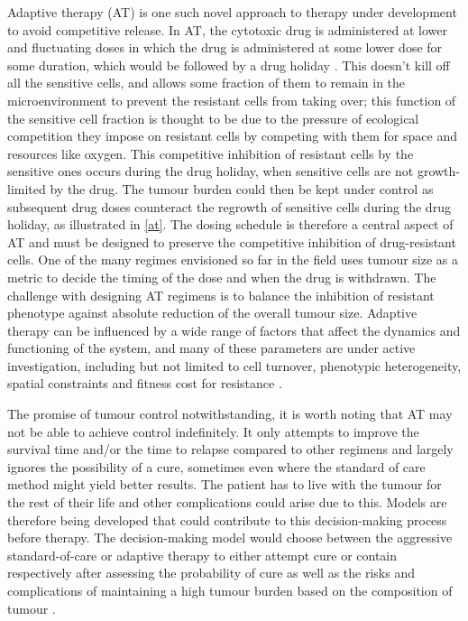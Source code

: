 Adaptive therapy (AT) is one such novel approach to therapy under development to avoid competitive release. In AT, the cytotoxic drug is administered at lower and fluctuating doses in which the drug is administered at some lower dose for some duration, which would be followed by a drug holiday \cite{Gatenby}. This doesn’t kill off all the sensitive cells, and allows some fraction of them to remain in the microenvironment to prevent the resistant cells from taking over; this function of the sensitive cell fraction is thought to be due to the pressure of ecological competition they impose on resistant cells by competing with them for space and resources like oxygen. This competitive inhibition of resistant cells by the sensitive ones occurs during the drug holiday, when sensitive cells are not growth-limited by the drug. The tumour burden could then be kept under control as subsequent drug doses counteract the regrowth of sensitive cells during the drug holiday, as illustrated in \autoref{at}. The dosing schedule is therefore a central aspect of AT and must be designed to preserve the competitive inhibition of drug-resistant cells. One of the many regimes envisioned so far in the field uses tumour size as a metric to decide the timing of the dose and when the drug is withdrawn. The challenge with designing AT regimens is to balance the inhibition of resistant phenotype against absolute reduction of the overall tumour size. Adaptive therapy can be influenced by a wide range of factors that affect the dynamics and functioning of the system, and many of these parameters are under active investigation, including but not limited to cell turnover,  phenotypic heterogeneity, spatial constraints and fitness cost for resistance \cite{Strobl,Gallaher,Viossat,Bacevic}.

The promise of tumour control notwithstanding, it is worth noting that AT may not be able to achieve control indefinitely. It only attempts to improve the survival time and/or the time to relapse compared to other regimens and largely ignores the possibility of a cure, sometimes even where the standard of care method might yield better results. The patient has to live with the tumour for the rest of their life and other complications could arise due to this. Models are therefore being developed that could contribute to this decision-making process before therapy. The decision-making model would choose between the aggressive standard-of-care or adaptive therapy to either attempt cure or contain respectively after assessing the probability of cure as well as the risks and complications of maintaining a high tumour burden based on the composition of tumour \cite{Hansen}.

